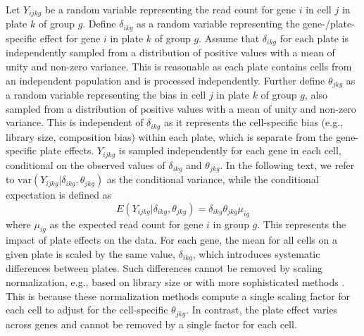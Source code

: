 \documentclass[oupdraft]{bio}
\begin{document}
Let $Y_{ijkg}$ be a random variable representing the read count for gene $i$ in cell $j$ in plate $k$ of group $g$.
Define $\delta_{ikg}$ as a random variable representing the gene-/plate-specific effect for gene $i$ in plate $k$ of group $g$.
Assume that $\delta_{ikg}$ for each plate is independently sampled from a distribution of positive values with a mean of unity and non-zero variance.
This is reasonable as each plate contains cells from an independent population and is processed independently.
Further define $\theta_{jkg}$ as a random variable representing the bias in cell $j$ in plate $k$ of group $g$, also sampled from a distribution of positive values with a mean of unity and non-zero variance.
This is independent of $\delta_{ikg}$ as it represents the cell-specific bias (e.g., library size, composition bias) within each plate, which is separate from the gene-specific plate effects.
$Y_{ijkg}$ is sampled independently for each gene in each cell, conditional on the observed values of $\delta_{ikg}$ and $\theta_{jkg}$.
In the following text, we refer to $\mbox{var}(Y_{ijkg}|\delta_{ikg},\theta_{jkg})$ as the conditional variance, while the conditional expectation is defined as
\[
    E(Y_{ijkg}|\delta_{ikg},\theta_{jkg}) = \delta_{ikg}\theta_{jkg}\mu_{ig} 
\]
where $\mu_{ig}$ as the expected read count for gene $i$ in group $g$.
This represents the impact of plate effects on the data.
For each gene, the mean for all cells on a given plate is scaled by the same value, $\delta_{ikg}$, which introduces systematic differences between plates.
Such differences cannot be removed by scaling normalization, e.g., based on library size or with more sophisticated methods \citep{anders2010differential,robinson2010scaling}.
This is because these normalization methods compute a single scaling factor for each cell to adjust for the cell-specific $\theta_{jkg}$.
In contrast, the plate effect varies across genes and cannot be removed by a single factor for each cell.


\end{document}
